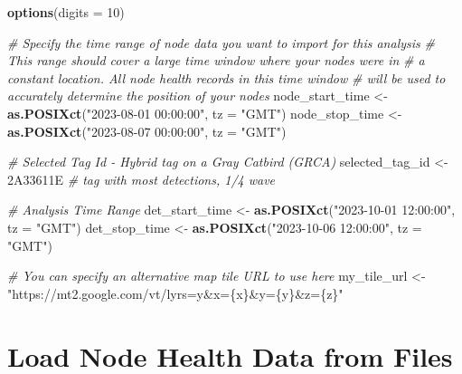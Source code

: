 \documentclass[
]{book}
\newenvironment{Shaded}{\begin{snugshade}}{\end{snugshade}}
\newcommand{\AttributeTok}[1]{\textcolor[rgb]{0.13,0.29,0.53}{#1}}
\newcommand{\CommentTok}[1]{\textcolor[rgb]{0.56,0.35,0.01}{\textit{#1}}}
\newcommand{\DecValTok}[1]{\textcolor[rgb]{0.00,0.00,0.81}{#1}}
\newcommand{\FunctionTok}[1]{\textcolor[rgb]{0.13,0.29,0.53}{\textbf{#1}}}
\newcommand{\NormalTok}[1]{#1}
\newcommand{\OtherTok}[1]{\textcolor[rgb]{0.56,0.35,0.01}{#1}}
\newcommand{\StringTok}[1]{\textcolor[rgb]{0.31,0.60,0.02}{#1}}
\begin{document}
\begin{Shaded}
\begin{Highlighting}[]
\FunctionTok{options}\NormalTok{(}\AttributeTok{digits =} \DecValTok{10}\NormalTok{)}

\CommentTok{\# Specify the time range of node data you want to import for this analysis}
\CommentTok{\#   This range should cover a large time window where your nodes were in}
\CommentTok{\#   a constant location.  All node health records in this time window}
\CommentTok{\#   will be used to accurately determine the position of your nodes}
\NormalTok{node\_start\_time }\OtherTok{\textless{}{-}} \FunctionTok{as.POSIXct}\NormalTok{(}\StringTok{"2023{-}08{-}01 00:00:00"}\NormalTok{, }\AttributeTok{tz =} \StringTok{"GMT"}\NormalTok{)}
\NormalTok{node\_stop\_time }\OtherTok{\textless{}{-}} \FunctionTok{as.POSIXct}\NormalTok{(}\StringTok{"2023{-}08{-}07 00:00:00"}\NormalTok{, }\AttributeTok{tz =} \StringTok{"GMT"}\NormalTok{)}

\CommentTok{\# Selected Tag Id {-} Hybrid tag on a Gray Catbird (GRCA)}
\NormalTok{selected\_tag\_id }\OtherTok{\textless{}{-}} \StringTok{\textquotesingle{}2A33611E\textquotesingle{}} \CommentTok{\# tag with most detections, 1/4 wave}

\CommentTok{\# Analysis Time Range}
\NormalTok{det\_start\_time }\OtherTok{\textless{}{-}} \FunctionTok{as.POSIXct}\NormalTok{(}\StringTok{"2023{-}10{-}01 12:00:00"}\NormalTok{, }\AttributeTok{tz =} \StringTok{"GMT"}\NormalTok{)}
\NormalTok{det\_stop\_time }\OtherTok{\textless{}{-}} \FunctionTok{as.POSIXct}\NormalTok{(}\StringTok{"2023{-}10{-}06 12:00:00"}\NormalTok{, }\AttributeTok{tz =} \StringTok{"GMT"}\NormalTok{)}

\CommentTok{\# You can specify an alternative map tile URL to use here}
\NormalTok{my\_tile\_url }\OtherTok{\textless{}{-}} \StringTok{"https://mt2.google.com/vt/lyrs=y\&x=\{x\}\&y=\{y\}\&z=\{z\}"}
\end{Highlighting}
\end{Shaded}

\section{Load Node Health Data from Files}\label{load-node-health-data-from-files-1}
\end{document}
